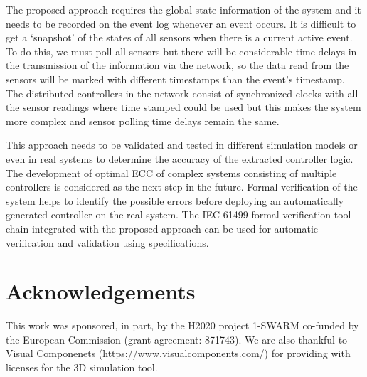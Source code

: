 \begin{bibunit}
The proposed approach requires the global state information of the system and it needs to be recorded on the event log whenever an event occurs. It is difficult to get a ‘snapshot’ of the states of all sensors when there is a current active event.  To do this, we must poll all sensors but there will be considerable time delays in the transmission of the information via the network, so the data read from the sensors will be marked with different timestamps than the event’s timestamp. The distributed controllers in the network consist of synchronized clocks with all the sensor readings where time stamped could be used but this makes the system more complex and sensor polling time delays remain the same. 


This approach needs to  be validated and tested in different simulation models or even in real systems to determine the accuracy of the extracted controller logic. The development of optimal ECC of complex systems consisting of multiple controllers is considered as the next step in the future. Formal verification of the system helps to identify the possible errors before deploying an automatically generated controller on the real system. The IEC 61499 formal verification tool chain \cite{xavier2021cyber} integrated with the proposed approach can be used for automatic verification and validation using specifications.


\section{Acknowledgements}
This work was sponsored, in part, by the H2020 project 1-SWARM co-funded by the European Commission (grant agreement: 871743). We are also thankful to Visual Componenets (https://www.visualcomponents.com/) for providing with licenses for the 3D simulation tool.

\clearpage
\putbib
\end{bibunit} 